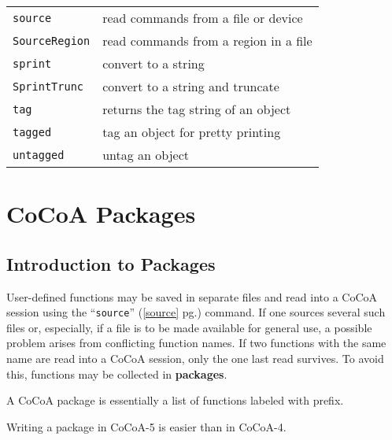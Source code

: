 \documentclass[a4paper]{mybook}
\begin{document}
\begin{center}
\begin{longtable}{ll}
{\verb~source~} &
      read commands from a file or device\\
   
{\verb~SourceRegion~} &
      read commands from a region in a file\\
   
{\verb~sprint~} &
      convert to a string\\
   
{\verb~SprintTrunc~} &
      convert to a string and truncate\\
   
{\verb~tag~} &
      returns the tag string of an object\\
   
{\verb~tagged~} &
      tag an object for pretty printing\\
   
{\verb~untagged~} &
      untag an object\\
   
\end{longtable}
\end{center}

\noindent



\chapter{CoCoA Packages}
\label{CoCoA Packages}

      

\section{Introduction to Packages}
\label{Introduction to Packages}

        
User-defined functions may be saved in separate files and read into a
CoCoA session using the ``\verb&source&'' (\ref{source} pg.\pageref{source}) command.
If one sources several such files or, especially, if a file is to be
made available for general use, a possible problem arises from
conflicting function names.
If two functions with the same name are read into a CoCoA session, only
the one last read survives.
To avoid this, functions may be collected in \textbf{packages}.
\par 
A CoCoA package is essentially a list of functions labeled with prefix.
\par 
Writing a package in CoCoA-5 is easier than in CoCoA-4.
\end{document}
